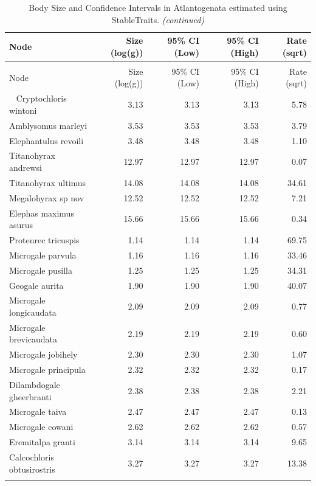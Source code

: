 \documentclass[]{elsarticle} %
\begin{document}
\begin{longtable}[t]{lrrrr}
\caption{\label{tab:Table-BodySize}Body Size and Confidence Intervals in Atlantogenata estimated using StableTraits.}\\
\toprule
Node & Size (log(g)) & 95\% CI (Low) & 95\% CI (High) & Rate (sqrt)\\
\midrule
\endfirsthead
\caption[]{\label{tab:Table-BodySize}Body Size and Confidence Intervals in Atlantogenata estimated using StableTraits. \textit{(continued)}}\\
\toprule
Node & Size (log(g)) & 95\% CI (Low) & 95\% CI (High) & Rate (sqrt)\\
\midrule
\endhead
\
\endfoot
\bottomrule
\endlastfoot
Cryptochloris wintoni & 3.13 & 3.13 & 3.13 & 5.78\\
Amblysomus marleyi & 3.53 & 3.53 & 3.53 & 3.79\\
Elephantulus revoili & 3.48 & 3.48 & 3.48 & 1.10\\
Titanohyrax andrewsi & 12.97 & 12.97 & 12.97 & 0.07\\
Titanohyrax ultimus & 14.08 & 14.08 & 14.08 & 34.61\\
\addlinespace
Megalohyrax sp  nov & 12.52 & 12.52 & 12.52 & 7.21\\
Elephas maximus asurus & 15.66 & 15.66 & 15.66 & 0.34\\
Protenrec tricuspis & 1.14 & 1.14 & 1.14 & 69.75\\
Microgale parvula & 1.16 & 1.16 & 1.16 & 33.46\\
Microgale pusilla & 1.25 & 1.25 & 1.25 & 34.31\\
\addlinespace
Geogale aurita & 1.90 & 1.90 & 1.90 & 40.07\\
Microgale longicaudata & 2.09 & 2.09 & 2.09 & 0.77\\
Microgale brevicaudata & 2.19 & 2.19 & 2.19 & 0.60\\
Microgale jobihely & 2.30 & 2.30 & 2.30 & 1.07\\
Microgale principula & 2.32 & 2.32 & 2.32 & 0.17\\
\addlinespace
Dilambdogale gheerbranti & 2.38 & 2.38 & 2.38 & 2.21\\
Microgale taiva & 2.47 & 2.47 & 2.47 & 0.13\\
Microgale cowani & 2.62 & 2.62 & 2.62 & 0.57\\
Eremitalpa granti & 3.14 & 3.14 & 3.14 & 9.65\\
Calcochloris obtusirostris & 3.27 & 3.27 & 3.27 & 13.38\\
\addlinespace

\end{longtable}
\end{document}

